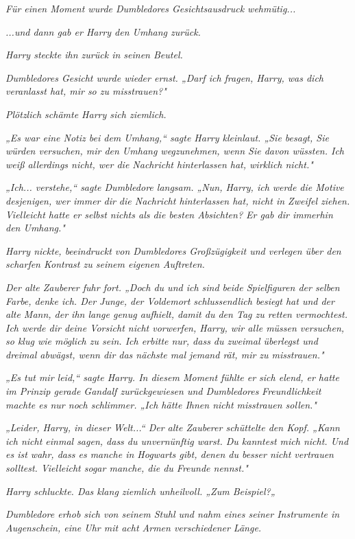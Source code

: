 {\emph{Für einen Moment wurde Dumbledores Gesichtsausdruck wehmütig...}

\emph{...und dann gab er Harry den Umhang zurück.}

\emph{Harry steckte ihn zurück in seinen Beutel.}

\emph{Dumbledores Gesicht wurde wieder ernst. „Darf ich fragen, Harry, was dich veranlasst hat, mir so zu misstrauen?"}

\emph{Plötzlich schämte Harry sich ziemlich.}

\emph{„Es war eine Notiz bei dem Umhang,“ sagte Harry kleinlaut. „Sie besagt, Sie würden versuchen, mir den Umhang wegzunehmen, wenn Sie davon wüssten. Ich weiß allerdings nicht, wer die Nachricht hinterlassen hat, wirklich nicht."}

\emph{„Ich... verstehe,“ sagte Dumbledore langsam. „Nun, Harry, ich werde die Motive desjenigen, wer immer dir die Nachricht hinterlassen hat, nicht in Zweifel ziehen. Vielleicht hatte er selbst nichts als die besten Absichten? Er gab dir immerhin den Umhang."}

\emph{Harry nickte, beeindruckt von Dumbledores Großzügigkeit und verlegen über den scharfen Kontrast zu seinem eigenen Auftreten.}

\emph{Der alte Zauberer fuhr fort. „Doch du und ich sind beide Spielfiguren der selben Farbe, denke ich. Der Junge, der Voldemort schlussendlich besiegt hat und der alte Mann, der ihn lange genug aufhielt, damit du den Tag zu retten vermochtest. Ich werde dir deine Vorsicht nicht vorwerfen, Harry, wir alle müssen versuchen, so klug wie möglich zu sein. Ich erbitte nur, dass du zweimal überlegst und dreimal abwägst, wenn dir das nächste mal jemand rät, mir zu misstrauen."}

\emph{„Es tut mir leid,“ sagte Harry. In diesem Moment fühlte er sich elend, er hatte im Prinzip gerade Gandalf zurückgewiesen und Dumbledores} \emph{Freundlichkeit machte es nur noch schlimmer. „Ich hätte Ihnen nicht misstrauen sollen."}

\emph{„Leider, Harry, in dieser Welt...“ Der alte Zauberer schüttelte den Kopf. „Kann ich nicht einmal sagen, dass du unvernünftig warst. Du kanntest mich nicht. Und es ist wahr, dass es manche in Hogwarts gibt, denen du besser nicht vertrauen solltest. Vielleicht sogar manche, die du Freunde nennst."}

\emph{Harry schluckte. Das klang ziemlich unheilvoll. „Zum Beispiel?„}

\emph{Dumbledore erhob sich von seinem Stuhl und nahm eines seiner Instrumente in Augenschein, eine Uhr mit acht Armen verschiedener Länge.}

}
